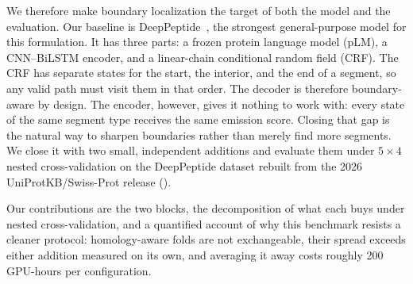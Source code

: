 \documentclass{article}
\begin{document}
We therefore make boundary localization the target of both the model and the evaluation. Our baseline is DeepPeptide~\citep{deeppeptide2023}, the strongest general-purpose model for this formulation. It has three parts: a frozen protein language model (pLM), a CNN--BiLSTM encoder, and a linear-chain conditional random field (CRF). The CRF has separate states for the start, the interior, and the end of a segment, so any valid path must visit them in that order. The decoder is therefore boundary-aware by design. The encoder, however, gives it nothing to work with: every state of the same segment type receives the same emission score. Closing that gap is the natural way to sharpen boundaries rather than merely find more segments. We close it with two small, independent additions and evaluate them under $5\times4$ nested cross-validation on the DeepPeptide dataset rebuilt from the 2026 UniProtKB/Swiss-Prot release ().




Our contributions are the two blocks, the decomposition of what each buys under nested
cross-validation, and a quantified account of why this benchmark resists a cleaner protocol:
homology-aware folds are not exchangeable, their spread exceeds either addition measured on its own,
and averaging it away costs roughly 200 GPU-hours per configuration.
\end{document}
